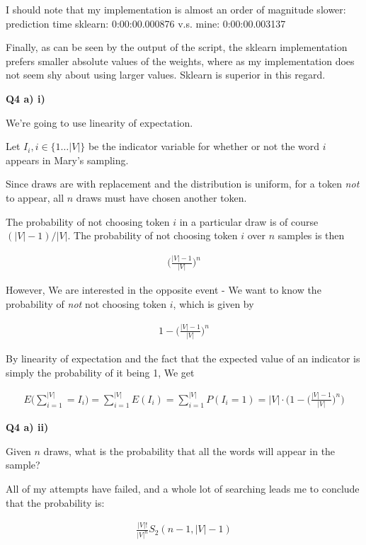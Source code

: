 \documentclass{article}
\begin{document}
	I should note that my implementation is almost an order of magnitude slower: prediction time sklearn: 0:00:00.000876 v.s. mine: 0:00:00.003137
	
	Finally, as can be seen by the output of the script, the sklearn implementation prefers smaller absolute values of the weights, where as my implementation does not seem shy about using larger values. Sklearn is superior in this regard.
	 

\newpage

\textbf{Q4 a) i)}

	We're going to use linearity of expectation.
	
	Let $I_i, i\in \{1\ldots |V|\}$ be the indicator variable for whether or not the word $i$ appears in Mary's sampling.
	
	Since draws are with replacement and the distribution is uniform, for a token \textit{not} to appear, all $n$ draws must have chosen another token. 
	
	The probability of not choosing token $i$ in a particular draw is of course $(|V|-1)/|V|$. The probability of not choosing token $i$ over $n$ samples is then
	
	\begin{align}
		\bigg(\frac{|V|-1}{|V|}\bigg)^n
	\end{align}
	
	However, We are interested in the opposite event - We want to know the probability of \textit{not} not choosing token $i$, which is given by
	
	\begin{align}
		1 - \bigg(\frac{|V|-1}{|V|}\bigg)^n
	\end{align}
	
	By linearity of expectation and the fact that the expected value of an indicator is simply the probability of it being 1, We get
	
	\begin{align}
		E\bigg(\sum^{|V|}_{i=1} = I_i \bigg) = \sum^{|V|}_{i=1} E(I_i) =  \sum^{|V|}_{i=1} P(I_i = 1) = |V|\cdot \bigg( 1 - \bigg(\frac{|V|-1}{|V|}\bigg)^n\bigg)
	\end{align}
	
\textbf{Q4 a) ii)}

	Given $n$ draws, what is the probability that all the words will appear in the sample? 
	
	All of my attempts have failed, and a whole lot of searching leads me to conclude that the probability is:
	
	\begin{align}
		\frac{|V|!}{|V|^n}S_2(n-1, |V|-1)
	\end{align}
	
\end{document}
